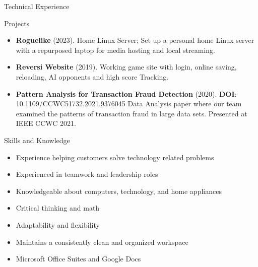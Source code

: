\documentclass[]{mcdowellcvcustom}
\begin{document}
	\vspace{6mm}
	
	\begin{cvsection}{Technical Experience}
		\begin{cvsubsection}{Projects}{}{}
			\begin{itemize}
				\item \textbf{Roguelike} (2023). Home Linux Server; Set up a personal home Linux server with a repurposed laptop for media hosting and local streaming.
				
				\item \textbf{Reversi Website} (2019). Working game site with login, online saving, reloading, AI opponents and high score Tracking.
				
				\item \textbf{Pattern Analysis for Transaction Fraud Detection} (2020). \textbf{DOI}: 10.1109/CCWC51732.2021.9376045 Data Analysis paper where our team examined the patterns of transaction fraud in large data sets. Presented at IEEE CCWC 2021.
				
			\end{itemize}
		\end{cvsubsection}
	\end{cvsection}
	
	\vspace{6mm}

	\begin{cvsection}{Skills and Knowledge}
		\begin{cvsubsection}{}{}{}	
			\begin{itemize}
				\item Experience helping customers solve technology related problems
				\item Experienced in teamwork and leadership roles
				\item Knowledgeable about computers, technology, and home appliances
				\item Critical thinking and math
				\item Adaptability and flexibility
				\item Maintains a consistently clean and organized workspace
				\item Microsoft Office Suites and Google Docs
			\end{itemize}
		\end{cvsubsection}
	\end{cvsection}
	
\end{document}
